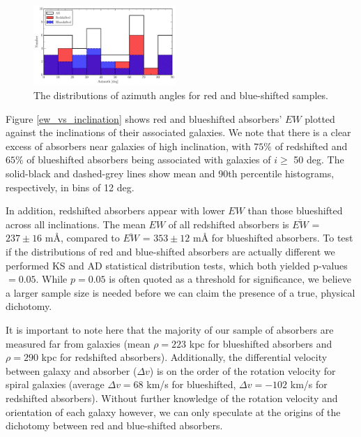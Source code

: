 \documentclass[iop]{emulateapj-rtx4}
\begin{document}
\begin{figure}[ht!]
        \centering
        \includegraphics[width=0.48\textwidth]{hist(azimuth)_overlaid_all.pdf}
        \caption{\small{The distributions of azimuth angles for red and blue-shifted samples.}}
        \label{azimuth_dist}
        \vspace{5pt}
\end{figure} 


Figure \ref{ew_vs_inclination} shows red and blueshifted absorbers' $EW$ plotted against the inclinations of their associated galaxies. We note that there is a clear excess of absorbers near galaxies of high inclination, with $75\%$ of redshifted and $65\%$ of blueshifted absorbers being associated with galaxies of $i \geq$ 50 deg. The solid-black and dashed-grey lines show mean and 90th percentile histograms, respectively, in bins of 12 deg. 

In addition, redshifted absorbers appear with lower $EW$ than those blueshifted across all inclinations. The mean $EW$ of all redshifted absorbers is $\overline{EW}$ = $237 \pm 16$  $\textrm{m\AA}$, compared to $\overline{EW}$ = $353 \pm 12$ $\textrm{m\AA}$ for blueshifted absorbers. To test if the distributions of red and blue-shifted absorbers are actually different we performed KS and AD statistical distribution tests, which both yielded p-values $=0.05$. While $p=0.05$ is often quoted as a threshold for significance, we believe a larger sample size is needed before we can claim the presence of a true, physical dichotomy.

It is important to note here that the majority of our sample of absorbers are measured far from galaxies (mean $\rho = 223$ kpc for blueshifted absorbers and $\rho = 290$ kpc for redshifted absorbers). Additionally, the differential velocity between galaxy and absorber ($\Delta v$) is on the order of the rotation velocity for spiral galaxies (average $\Delta v = 68$ km/s for blueshifted, $\Delta v = -102$ km/s for redshifted absorbers). Without further knowledge of the rotation velocity and orientation of each galaxy however, we can only speculate at the origins of the dichotomy between red and blue-shifted absorbers.
\end{document}
